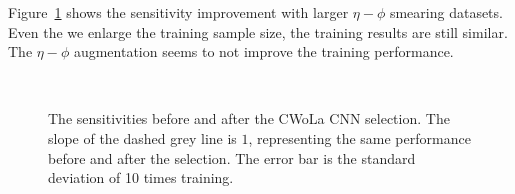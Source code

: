 \documentclass[12pt]{article}
\begin{document}
		Figure~\ref{fig:sensitivity_improvement_origin_eta_phi_aug_1_3} shows the sensitivity improvement with larger $\eta-\phi$ smearing datasets. Even the we enlarge the training sample size, the training results are still similar. The $\eta-\phi$ augmentation seems to not improve the training performance.
		\begin{figure}[htpb]
			\centering
			 \\
			\caption{The sensitivities before and after the CWoLa CNN selection. The slope of the dashed grey line is $1$, representing the same performance before and after the selection. The error bar is the standard deviation of 10 times training.}
			\label{fig:sensitivity_improvement_origin_eta_phi_aug_1_3}
		\end{figure}
\end{document}
